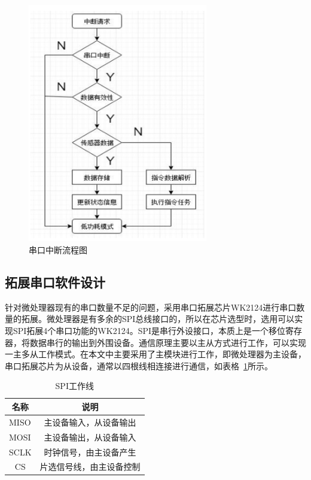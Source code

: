 \begin{figure}[ht]
    \centering
	\includegraphics[width=0.7\textwidth]{fig/串口中断流程图.png}
	\caption{串口中断流程图}
	\label{fig:串口中断流程图}
\end{figure}

\subsection{拓展串口软件设计}
针对微处理器现有的串口数量不足的问题，采用串口拓展芯片WK2124进行串口数量的拓展。微处理器是有多余的SPI总线接口的，所以在芯片选型时，选用可以实现SPI拓展4个串口功能的WK2124。SPI是串行外设接口，本质上是一个移位寄存器，将数据串行的输出到外围设备。通信原理主要以主从方式进行工作，可以实现一主多从工作模式。在本文中主要采用了主模块进行工作，即微处理器为主设备，串口拓展芯片为从设备，通常以四根线相连接进行通信，如表格~\ref{tab:SPI工作线}所示。

\begin{table}[htb]
  \centering\small
  \caption{SPI工作线}
  \label{tab:SPI工作线}
\begin{tabular}{|c|c|c|}
\hline
\multicolumn{2}{|c|}{\bf 名称}                  & {\bf 说明}                         \\ \hline
\multicolumn{2}{|l|}{MISO}                  & \multicolumn{1}{|c|}{主设备输入，从设备输出}                \\ \hline
\multicolumn{2}{|l|}{MOSI}                  & \multicolumn{1}{c|}{主设备输出，从设备输入}                \\ \hline
\multicolumn{2}{|l|}{SCLK}                  & \multicolumn{1}{c|}{时钟信号，由主设备产生}                         \\ \hline
\multicolumn{2}{|c|}{CS}                  & \multicolumn{1}{c|}{片选信号线，由主设备控制}                     \\ \hline
\end{tabular}
\end{table}

